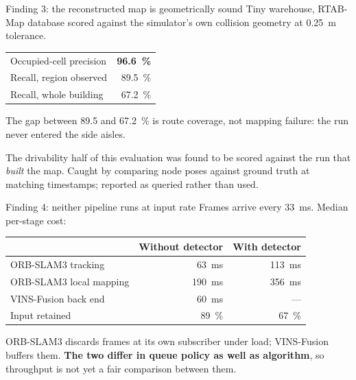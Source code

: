 \documentclass[aspectratio=169,11pt]{beamer}
\begin{document}
\begin{frame}{Finding 3: the reconstructed map is geometrically sound}
  Tiny warehouse, RTAB-Map database scored against the simulator's own collision
  geometry at \SI{0.25}{\metre} tolerance.

  \vspace{0.8em}
  \centering
  \begin{tabular}{lr}
    \toprule
    Occupied-cell precision & \textbf{\SI{96.6}{\percent}} \\
    Recall, region observed & \SI{89.5}{\percent} \\
    Recall, whole building & \SI{67.2}{\percent} \\
    \bottomrule
  \end{tabular}

  \vspace{0.8em}
  \raggedright
  The gap between \SI{89.5}{} and \SI{67.2}{\percent} is route coverage, not
  mapping failure: the run never entered the side aisles.

  \vspace{0.5em}
  \footnotesize The drivability half of this evaluation was found to be scored
  against the run that \emph{built} the map. Caught by comparing node poses
  against ground truth at matching timestamps; reported as queried rather than
  used.
\end{frame}

\begin{frame}{Finding 4: neither pipeline runs at input rate}
  Frames arrive every \SI{33}{\milli\second}. Median per-stage cost:

  \vspace{0.8em}
  \centering\small
  \begin{tabular}{lrr}
    \toprule
    & Without detector & With detector \\
    \midrule
    ORB-SLAM3 tracking & \SI{63}{\milli\second} & \SI{113}{\milli\second} \\
    ORB-SLAM3 local mapping & \SI{190}{\milli\second} & \SI{356}{\milli\second} \\
    VINS-Fusion back end & \SI{60}{\milli\second} & --- \\
    \midrule
    Input retained & \SI{89}{\percent} & \SI{67}{\percent} \\
    \bottomrule
  \end{tabular}

  \vspace{0.8em}
  \raggedright
  ORB-SLAM3 discards frames at its own subscriber under load; VINS-Fusion
  buffers them. \textbf{The two differ in queue policy as well as algorithm}, so
  throughput is not yet a fair comparison between them.
\end{frame}
\end{document}
